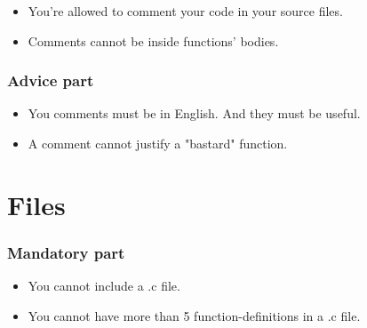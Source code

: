 \documentclass{42-en}
\begin{document}
            \begin{itemize}

    		\item You're allowed to comment your code in your source files.

		\item Comments cannot be inside functions' bodies.

            \end{itemize}

        \subsubsection{Advice part}

            \begin{itemize}

                \item You comments must be in English. And they must be
                  useful.

		\item A comment cannot justify a "bastard" function.

            \end{itemize}


    \section{Files}

        \subsubsection{Mandatory part}

            \begin{itemize}

 		\item You cannot include a .c file.

	    	\item You cannot have more than 5 function-definitions in a .c file.

            \end{itemize}


\end{document}
